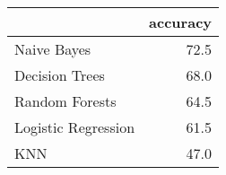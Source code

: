 \begin{tabular}{lr}
\toprule
{} &  accuracy \\
\midrule
Naive Bayes         &      72.5 \\
Decision Trees      &      68.0 \\
Random Forests      &      64.5 \\
Logistic Regression &      61.5 \\
KNN                 &      47.0 \\
\bottomrule
\end{tabular}

